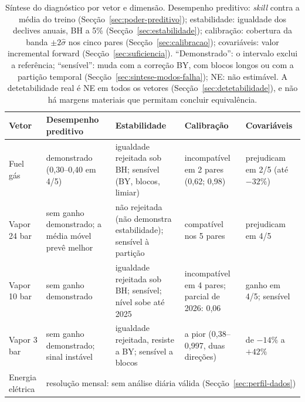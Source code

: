 \begin{table}[htbp]
  \centering
  \caption[Síntese do diagnóstico por vetor]{Síntese do diagnóstico por
  vetor e dimensão. Desempenho preditivo: \emph{skill} contra a média do treino
  (Secção~\ref{sec:poder-preditivo}); estabilidade: igualdade dos declives
  anuais, BH a 5\% (Secção~\ref{sec:estabilidade}); calibração: cobertura da
  banda $\pm 2\hat\sigma$ nos cinco pares (Secção~\ref{sec:calibracao});
  covariáveis: valor incremental forward (Secção~\ref{sec:suficiencia}).
  ``Demonstrado'': o intervalo exclui a referência; ``sensível'': muda com a
  correção BY, com blocos longos ou com a partição temporal
  (Secção~\ref{sec:sintese-modos-falha}); NE: não estimável. A
  detetabilidade real é NE em todos os vetores (Secção~\ref{sec:detetabilidade}),
  e não há margens materiais que permitam concluir equivalência.}
  \label{tab:sintese-vectores}
  \small
  \begin{tabular}{lp{2.5cm}p{2.6cm}p{2.9cm}p{2.9cm}}
    \toprule
    Vetor & Desempenho preditivo & Estabilidade & Calibração & Covariáveis \\
    \midrule
    Fuel gás & demonstrado (0{,}30--0{,}40 em 4/5) & igualdade rejeitada sob BH; sensível (BY, blocos, limiar) & incompatível em 2 pares (0{,}62; 0{,}98) & prejudicam em 2/5 (até $-32\%$) \\
    Vapor 24 bar & sem ganho demonstrado; a média móvel prevê melhor & não rejeitada (não demonstra estabilidade); sensível à partição & compatível nos 5 pares & prejudicam em 4/5 \\
    Vapor 10 bar & sem ganho demonstrado & igualdade rejeitada sob BH; sensível; nível sobe até 2025 & incompatível em 4 pares; parcial de 2026: 0{,}06 & ganho em 4/5; sensível \\
    Vapor 3 bar & sem ganho demonstrado; sinal instável & igualdade rejeitada, resiste a BY; sensível a blocos & a pior (0{,}38--0{,}997, duas direções) & de $-14\%$ a $+42\%$ \\
    \addlinespace
    Energia elétrica & \multicolumn{4}{l}{resolução mensal: sem análise diária válida (Secção~\ref{sec:perfil-dados})} \\
    \bottomrule
  \end{tabular}
\end{table}

